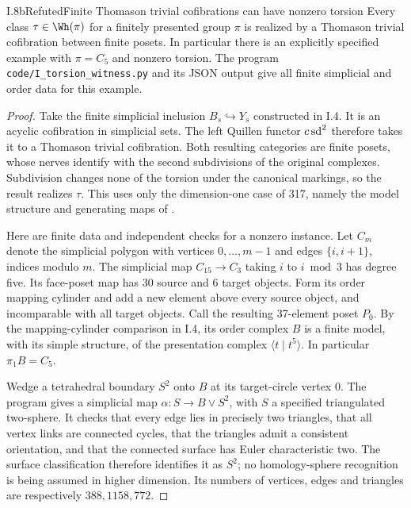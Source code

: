 \begin{claim}{I.8b}{Refuted}{Finite Thomason trivial cofibrations can have nonzero torsion}
Every class $\tau\in\Wh(\pi)$ for a finitely presented group $\pi$
is realized by a Thomason trivial cofibration between finite posets.
In particular there is an explicitly specified example with
$\pi=C_5$ and nonzero torsion. The program
\texttt{code/I\_torsion\_witness.py} and its JSON output give all
finite simplicial and order data for this example.
\end{claim}
\begin{proof}
Take the finite simplicial inclusion $B_s\hookrightarrow Y_s$
constructed in I.4. It is an acyclic cofibration in simplicial sets.
The left Quillen functor $c\operatorname{sd}^2$ therefore takes it to a Thomason
trivial cofibration. Both resulting categories are finite posets,
whose nerves identify with the second subdivisions of the original
complexes. Subdivision changes none of the torsion under the canonical
markings, so the result realizes $\tau$. This uses only the
dimension-one case of 317, namely the model structure and generating
maps of \cite{I_Thomason1980}.

Here are finite data and independent checks for a nonzero instance.
Let $C_m$ denote the simplicial polygon with vertices
$0,\ldots,m-1$ and edges $\{i,i+1\}$, indices modulo $m$.
The simplicial map $C_{15}\to C_3$ taking $i$ to $i\bmod3$ has
degree five. Its face-poset map has 30 source and 6 target objects.
Form its order mapping cylinder and add a new element above every
source object, and incomparable with all target objects. Call the
resulting 37-element poset $P_0$. By the mapping-cylinder comparison
in I.4, its order complex $B$ is a finite model, with its simple
structure, of the presentation complex $\langle t\mid t^5\rangle$.
In particular $\pi_1B=C_5$.

Wedge a tetrahedral boundary $S^2$ onto $B$ at its target-circle
vertex $0$. The program gives a simplicial map
$\alpha:S\to B\vee S^2$, with $S$ a specified triangulated
two-sphere. It checks that every edge lies in precisely two
triangles, that all vertex links are connected cycles, that the
triangles admit a consistent orientation, and that the connected
surface has Euler characteristic two. The surface classification
therefore identifies it as $S^2$; no homology-sphere recognition is
being assumed in higher dimension. Its numbers of vertices, edges
and triangles are respectively $388,1158,772$.


\end{proof}
